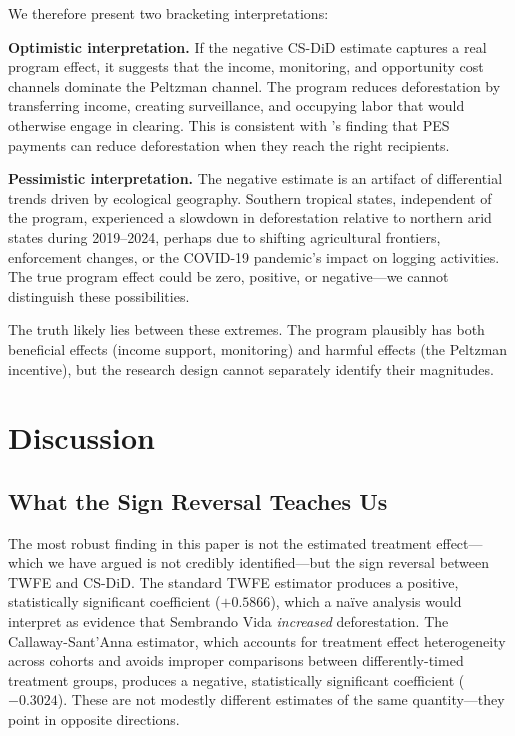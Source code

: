 \documentclass[12pt]{article}
\begin{document}
We therefore present two bracketing interpretations:

\textbf{Optimistic interpretation.} If the negative CS-DiD estimate captures a real program effect, it suggests that the income, monitoring, and opportunity cost channels dominate the Peltzman channel. The program reduces deforestation by transferring income, creating surveillance, and occupying labor that would otherwise engage in clearing. This is consistent with \citet{jayachandran2017cash}'s finding that PES payments can reduce deforestation when they reach the right recipients.

\textbf{Pessimistic interpretation.} The negative estimate is an artifact of differential trends driven by ecological geography. Southern tropical states, independent of the program, experienced a slowdown in deforestation relative to northern arid states during 2019--2024, perhaps due to shifting agricultural frontiers, enforcement changes, or the COVID-19 pandemic's impact on logging activities. The true program effect could be zero, positive, or negative---we cannot distinguish these possibilities.

The truth likely lies between these extremes. The program plausibly has both beneficial effects (income support, monitoring) and harmful effects (the Peltzman incentive), but the research design cannot separately identify their magnitudes.


\section{Discussion}

\subsection{What the Sign Reversal Teaches Us}

The most robust finding in this paper is not the estimated treatment effect---which we have argued is not credibly identified---but the sign reversal between TWFE and CS-DiD. The standard TWFE estimator produces a positive, statistically significant coefficient ($+0.5866$), which a na\"{i}ve analysis would interpret as evidence that Sembrando Vida \textit{increased} deforestation. The Callaway-Sant'Anna estimator, which accounts for treatment effect heterogeneity across cohorts and avoids improper comparisons between differently-timed treatment groups, produces a negative, statistically significant coefficient ($-0.3024$). These are not modestly different estimates of the same quantity---they point in opposite directions.
\end{document}
